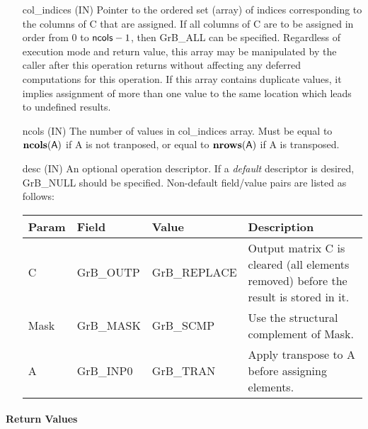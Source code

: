 \begin{itemize}[leftmargin=1in]
    \item[{\sf col\_indices}]  ({\sf IN}) Pointer to the ordered set (array) of 
    indices corresponding to the columns of {\sf C} that are assigned.  If all 
    columns of {\sf C} are to be assigned in order from $0$ to ${\sf ncols} - 1$, 
    then {\sf GrB\_ALL} can be specified.  Regardless of execution mode and return 
    value, this array may be manipulated by the caller after this operation 
    returns without affecting any deferred computations for this operation.
    If this array contains duplicate values, it implies assignment of more 
    than one value to the same location which leads to undefined results.
    
    \item[{\sf ncols}] ({\sf IN}) The number of values in {\sf col\_indices} 
	array. Must be equal to $\bold{ncols}({\sf A})$ if {\sf A} is not tranposed,
	or equal to $\bold{nrows}({\sf A})$ if {\sf A} is transposed.

    \item[{\sf desc}] ({\sf IN}) An optional operation descriptor. If
    a \emph{default} descriptor is desired, {\sf GrB\_NULL} should be
    specified. Non-default field/value pairs are listed as follows:  \\

    \begin{tabular}{lllp{2.5in}}
        Param & Field  & Value & Description \\
        \hline
        {\sf C}    & {\sf GrB\_OUTP} & {\sf GrB\_REPLACE} & Output matrix {\sf C}
        is cleared (all elements removed) before the result is stored in it. \\
        
        {\sf Mask} & {\sf GrB\_MASK} & {\sf GrB\_SCMP}   & Use the structural 
        complement of {\sf Mask}. \\

        {\sf A}    & {\sf GrB\_INP0} & {\sf GrB\_TRAN}   & Apply transpose to 
        {\sf A} before assigning elements.
    \end{tabular}
\end{itemize}

\paragraph{Return Values}

